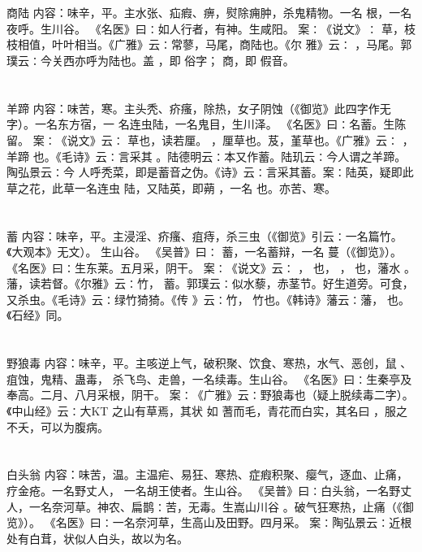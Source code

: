 \documentclass[12pt,UTF8]{ctexbook}
\begin{document}
\section{}商陆
内容：味辛，平。主水张、疝瘕、痹，熨除痈肿，杀鬼精物。一名 根，一名夜呼。生川谷。 
《名医》曰∶如人行者，有神。生咸阳。 
案∶《说文》∶ 草，枝枝相值，叶叶相当。《广雅》云∶常蓼，马尾，商陆也。《尔 
雅》云∶ ，马尾。郭璞云∶今关西亦呼为陆也。盖 ，即 俗字； 
商，即 假音。 


\section{}羊蹄
内容：味苦，寒。主头秃、疥瘙，除热，女子阴蚀（《御览》此四字作无字）。一名东方宿，一 
名连虫陆，一名鬼目，生川泽。 
《名医》曰∶名蓄。生陈留。 
案∶《说文》云∶ 草也，读若厘。 ，厘草也。芨，堇草也。《广雅》云∶ ，羊蹄 
也。《毛诗》云∶言采其 。陆德明云∶本又作蓄。陆玑云∶今人谓之羊蹄。陶弘景云∶今 
人呼秃菜，即是蓄音之伪。《诗》云∶言采其蓄。案∶陆英，疑即此草之花，此草一名连虫 
陆，又陆英，即蒴 ，一名 也。亦苦、寒。 


\section{}蓄
内容：味辛，平。主浸淫、疥瘙、疽痔，杀三虫（《御览》引云∶一名篇竹。《大观本》无文）。 
生山谷。 
《吴普》曰∶ 蓄，一名蓄辩，一名 蔓（《御览》）。 
《名医》曰∶生东莱。五月采，阴干。 
案∶《说文》云∶ ， 也， ， 也，藩水 。藩，读若督。《尔雅》云∶竹， 
蓄。郭璞云∶似水藜，赤茎节。好生道旁。可食，又杀虫。《毛诗》云∶绿竹猗猗。《传 
》云∶竹， 竹也。《韩诗》藩云∶藩， 也。《石经》同。 


\section{}野狼毒
内容：味辛，平。主咳逆上气，破积聚、饮食、寒热，水气、恶创，鼠 、疽蚀，鬼精、蛊毒， 
杀飞鸟、走兽，一名续毒。生山谷。 
《名医》曰∶生秦亭及奉高。二月、八月采根，阴干。 
案∶《广雅》云∶野狼毒也（疑上脱续毒二字）。《中山经》云∶大KT 之山有草焉，其状 
如 
蓍而毛，青花而白实，其名曰 ，服之不夭，可以为腹病。 


\section{}白头翁
内容：味苦，温。主温疟、易狂、寒热、症瘕积聚、瘿气，逐血、止痛，疗金疮。一名野丈人， 
一名胡王使者。生山谷。 
《吴普》曰∶白头翁，一名野丈人，一名奈河草。神农、扁鹊∶苦，无毒。生嵩山川谷 
。破气狂寒热，止痛（《御览》）。 
《名医》曰∶一名奈河草，生高山及田野。四月采。 
案∶陶弘景云∶近根处有白茸，状似人白头，故以为名。 
\end{document}
